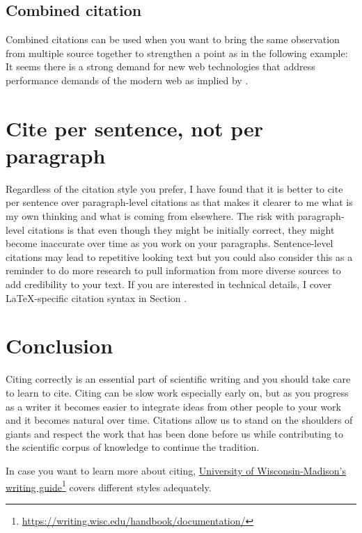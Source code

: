 \subsection{Combined citation}

Combined citations can be used when you want to bring the same observation from multiple source together to strengthen a point as in the following example: It seems there is a strong demand for new web technologies that address performance demands of the modern web as implied by \citep{vepsalainen2023implications, vepsalainen2023rise}.

\section{Cite per sentence, not per paragraph}

Regardless of the citation style you prefer, I have found that it is better to cite per sentence over paragraph-level citations as that makes it clearer to me what is my own thinking and what is coming from elsewhere.
The risk with paragraph-level citations is that even though they might be initially correct, they might become inaccurate over time as you work on your paragraphs.
Sentence-level citations may lead to repetitive looking text but you could also consider this as a reminder to do more research to pull information from more diverse sources to add credibility to your text.
If you are interested in technical details, I cover LaTeX-specific citation syntax in Section .




\section{Conclusion}

Citing correctly is an essential part of scientific writing and you should take care to learn to cite.
Citing can be slow work especially early on, but as you progress as a writer it becomes easier to integrate ideas from other people to your work and it becomes natural over time.
Citations allow us to stand on the shoulders of giants and respect the work that has been done before us while contributing to the scientific corpus of knowledge to continue the tradition.

In case you want to learn more about citing, \href{https://writing.wisc.edu/handbook/documentation/}{University of Wisconsin-Madison's writing guide}\footnote{\url{https://writing.wisc.edu/handbook/documentation/}} covers different styles adequately.
